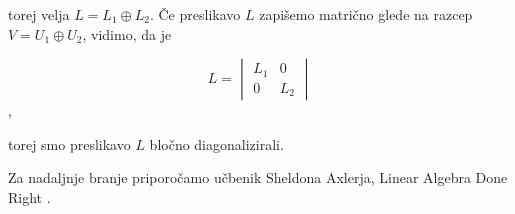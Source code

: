 \documentclass[a4paper,12pt]{article}
\begin{document}
torej velja $L = L_1 \oplus L_2$.
Če preslikavo $L$ zapišemo matrično glede na razcep $V = U_1 \oplus U_2$, vidimo, da je


$$L = \begin{vmatrix}L_1 & 0\\0 & L_2
\end{vmatrix}$$,

torej smo preslikavo $L$ bločno diagonalizirali.

Za nadaljnje branje priporočamo učbenik Sheldona Axlerja, Linear Algebra Done Right \cite{axler}.


\end{document}
